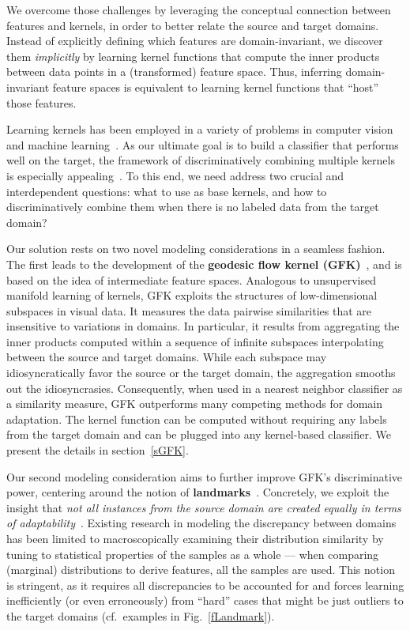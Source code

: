 We overcome those challenges by leveraging the conceptual connection between features and kernels, in order to better relate the source and target domains. Instead of explicitly defining which features are domain-invariant, we discover them \emph{implicitly} by learning kernel functions that compute the inner products between data points in a (transformed) feature space. Thus, inferring domain-invariant feature spaces is equivalent to learning kernel functions that ``host'' those features.

Learning kernels has been employed in a variety of problems in computer vision and machine learning~\cite{lanckriet04kernel,mkl_obj,ham2004kernel,roweis2000nonlinear,weinberger2006unsupervised}. As our ultimate goal is to build a classifier that performs well on the target, the framework of discriminatively combining multiple kernels is especially appealing~\cite{lanckriet04kernel}. To this end, we need address two crucial and interdependent questions: what to use as base kernels, and how to discriminatively combine them when there is no labeled data from the target domain?  

Our solution rests on two novel modeling considerations in a seamless fashion. The first  leads to the development of the {\bf geodesic flow kernel (GFK)}~\cite{GongCVPR12Geodesic}, and is based on the idea of intermediate feature spaces. Analogous to unsupervised manifold learning of kernels, GFK exploits the structures of low-dimensional subspaces in visual data. It measures the data pairwise similarities that are insensitive to variations in domains. In particular, it results from aggregating the inner products computed within a sequence of infinite subspaces interpolating between the source and target domains. While each subspace may idiosyncratically favor the source or the target domain, the aggregation smooths out the idiosyncrasies. Consequently, when used in a nearest neighbor classifier as a similarity measure, GFK outperforms many competing methods for domain adaptation. The kernel function can be computed without requiring any labels from the target domain and can be plugged into any kernel-based classifier. We present the details in section~\ref{sGFK}. 

Our second modeling consideration aims to further improve GFK's discriminative power, centering around the notion of \textbf{landmarks}~\cite{GongICML13Connecting}. Concretely, we exploit the insight that \emph{not all instances from the source domain are created equally in terms of adaptability}~\cite{GongICML13Connecting}.  Existing research in modeling the discrepancy between domains has been limited to macroscopically examining their distribution similarity by tuning to statistical properties of the samples as a whole --- when comparing (marginal) distributions to derive features, all the samples are used. This notion  is stringent, as it requires all discrepancies to  be accounted for and forces learning inefficiently (or even erroneously) from ``hard'' cases that might be just outliers to the target domains (cf.\ examples in Fig.~\ref{fLandmark}).

